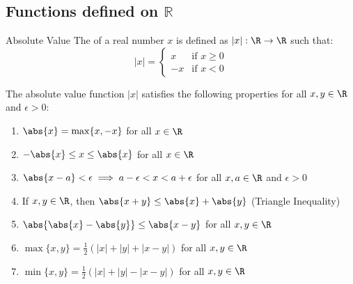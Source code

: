 \documentclass[openany]{book}
\begin{document}
\subsection{Functions defined on $\mathbb{R}$}
\begin{mydefinition}{Absolute Value}
    The  of a real number $x$ is defined as $|x|: \R \rightarrow \R$ such that:
    $$|x| = 
    \begin{cases}
        x & \text{if } x \geq 0 \\
        -x & \text{if } x < 0
    \end{cases}$$
\end{mydefinition}
\begin{mytheorem} The absolute value function $|x|$ satisfies the following properties for all $x, y \in \R$ and $\epsilon > 0$:
    \begin{enumerate}
        \item $\abs{x} = \max\{x, -x\}$ for all $x \in \R$
        \item $-\abs{x} \leq x \leq \abs{x}$ for all $x \in \R$
        \item $\abs{x - a} < \epsilon \implies a - \epsilon < x < a + \epsilon$ for all $x, a \in \R$ and $\epsilon > 0$
        \item If $x, y \in \R$, then $\abs{x + y} \leq \abs{x} + \abs{y}$ (Triangle Inequality)
        \item $\abs{\abs{x} - \abs{y}} \leq \abs{x - y}$ for all $x, y \in \R$
        \item $\max\{x, y\} = \frac{1}{2}(|x| + |y| + |x - y|)$ for all $x, y \in \R$
        \item $\min\{x, y\} = \frac{1}{2}(|x| + |y| - |x - y|)$ for all $x, y \in \R$
    \end{enumerate}
\end{mytheorem}
\end{document}
